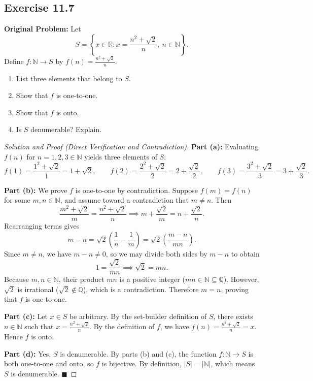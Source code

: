 \documentclass[11pt, letterpaper]{article}
\theoremstyle{definition}
\theoremstyle{remark}
\begin{document}
\subsection*{Exercise 11.7}
\textbf{Original Problem:} Let
\[
S = \left\{ x \in \mathbb{R} : x = \frac{n^2 + \sqrt{2}}{n},\ n \in \mathbb{N} \right\}.
\]
Define $f : \mathbb{N} \to S$ by $f(n) = \frac{n^2 + \sqrt{2}}{n}$.
\begin{enumerate}[label=(\alph*)]
    \item List three elements that belong to $S$.
    \item Show that $f$ is one-to-one.
    \item Show that $f$ is onto.
    \item Is $S$ denumerable? Explain.
\end{enumerate}

\begin{proof}[Solution and Proof (Direct Verification and Contradiction)]
\textbf{Part (a):} Evaluating $f(n)$ for $n = 1, 2, 3 \in \mathbb{N}$ yields three elements of $S$:
\[
f(1) = \frac{1^2 + \sqrt{2}}{1} = 1 + \sqrt{2}, \qquad f(2) = \frac{2^2 + \sqrt{2}}{2} = 2 + \frac{\sqrt{2}}{2}, \qquad f(3) = \frac{3^2 + \sqrt{2}}{3} = 3 + \frac{\sqrt{2}}{3}.
\]

\textbf{Part (b):} We prove $f$ is one-to-one by contradiction. Suppose $f(m) = f(n)$ for some $m, n \in \mathbb{N}$, and assume toward a contradiction that $m \neq n$. Then
\[
\frac{m^2 + \sqrt{2}}{m} = \frac{n^2 + \sqrt{2}}{n} \implies m + \frac{\sqrt{2}}{m} = n + \frac{\sqrt{2}}{n}.
\]
Rearranging terms gives
\[
m - n = \sqrt{2}\left(\frac{1}{n} - \frac{1}{m}\right) = \sqrt{2}\left(\frac{m - n}{mn}\right).
\]
Since $m \neq n$, we have $m - n \neq 0$, so we may divide both sides by $m - n$ to obtain
\[
1 = \frac{\sqrt{2}}{mn} \implies \sqrt{2} = mn.
\]
Because $m, n \in \mathbb{N}$, their product $mn$ is a positive integer ($mn \in \mathbb{N} \subseteq \mathbb{Q}$). However, $\sqrt{2}$ is irrational ($\sqrt{2} \notin \mathbb{Q}$), which is a contradiction. Therefore $m = n$, proving that $f$ is one-to-one.

\textbf{Part (c):} Let $x \in S$ be arbitrary. By the set-builder definition of $S$, there exists $n \in \mathbb{N}$ such that $x = \frac{n^2 + \sqrt{2}}{n}$. By the definition of $f$, we have $f(n) = \frac{n^2 + \sqrt{2}}{n} = x$. Hence $f$ is onto.

\textbf{Part (d):} Yes, $S$ is denumerable. By parts (b) and (c), the function $f : \mathbb{N} \to S$ is both one-to-one and onto, so $f$ is bijective. By definition, $|S| = |\mathbb{N}|$, which means $S$ is denumerable. $\blacksquare$
\end{proof}
\end{document}
